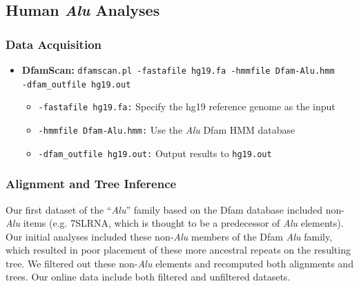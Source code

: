 \subsection{Human \textit{Alu} Analyses}
\subsubsection{Data Acquisition}\label{sup:aludata}
\begin{itemize}
\item \textbf{DfamScan:} \texttt{dfamscan.pl -fastafile hg19.fa -hmmfile Dfam-Alu.hmm\\-dfam\_outfile hg19.out}
\begin{itemize}
\item \texttt{-fastafile hg19.fa:} Specify the hg19 reference genome as the input
\item \texttt{-hmmfile Dfam-Alu.hmm:} Use the \textit{Alu} Dfam HMM database
\item \texttt{-dfam\_outfile hg19.out:} Output results to \texttt{hg19.out}
\end{itemize}
\end{itemize}

\subsubsection{Alignment and Tree Inference}\label{sup:alualignment}
Our first dataset of the ``\textit{Alu}'' family based on the Dfam database included non-\textit{Alu} items (e.g. 7SLRNA, which is thought to be a predecessor of \textit{Alu} elements). Our initial analyses included these non-\textit{Alu} members of the Dfam \textit{Alu} family, which resulted in poor placement of these more ancestral repeats on the resulting tree. We filtered out these non-\textit{Alu} elements and recomputed both alignments and trees. Our online data include both filtered and unfiltered datasets. 

